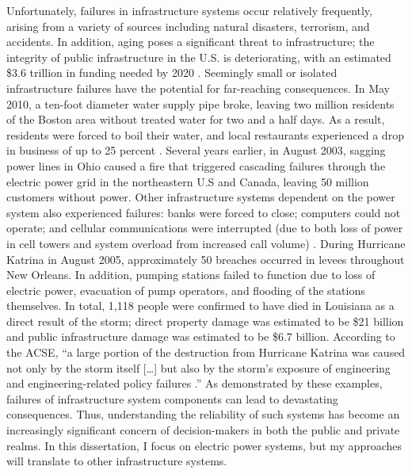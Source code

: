 Unfortunately, failures in infrastructure systems occur relatively frequently, arising from a variety of sources including natural disasters, terrorism, and accidents. In addition, aging poses a significant threat to infrastructure; the integrity of public infrastructure in the U.S. is deteriorating, with an estimated \$3.6 trillion in funding needed by 2020 \cite{ASCE2013}. Seemingly small or isolated infrastructure failures have the potential for far-reaching consequences. In May 2010, a ten-foot diameter water supply pipe broke, leaving two million residents of the Boston area without treated water for two and a half days. As a result, residents were forced to boil their water, and local restaurants experienced a drop in business of up to 25 percent \cite{Daley2010,Levenson2010}. Several years earlier, in August 2003, sagging power lines in Ohio caused a fire that triggered cascading failures through the electric power grid in the northeastern U.S and Canada, leaving 50 million customers without power. Other infrastructure systems dependent on the power system also experienced failures: banks were forced to close; computers could not operate; and cellular communications were interrupted (due to both loss of power in cell towers and system overload from increased call volume) \cite{Barron2003}. During Hurricane Katrina in August 2005, approximately 50 breaches occurred in levees throughout New Orleans. In addition, pumping stations failed to function due to loss of electric power, evacuation of pump operators, and flooding of the stations themselves. In total, 1,118 people were confirmed to have died in Louisiana as a direct result of the storm; direct property damage was estimated to be \$21 billion and public infrastructure damage was estimated to be \$6.7 billion. According to the ACSE, ``a large portion of the destruction from Hurricane Katrina was caused not only by the storm itself [\ldots] but also by the storm's exposure of engineering and engineering-related policy failures \cite{ASCE2007}.''  As demonstrated by these examples, failures of infrastructure system components can lead to devastating consequences. Thus, understanding the reliability of such systems has become an increasingly significant concern of decision-makers in both the public and private realms.  In this dissertation, I focus on electric power systems, but my approaches will translate to other infrastructure systems.

